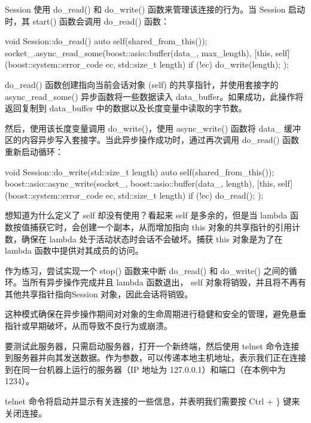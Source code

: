Session 使用 do\_read() 和 do\_write() 函数来管理该连接的行为。当 Session 启动时，其 start() 函数会调用 do\_read() 函数：

\begin{cpp}
void Session::do_read() {
    auto self(shared_from_this());
    socket_.async_read_some(boost::asio::buffer(data_,
                                            max_length),
    [this, self](boost::system::error_code ec,
                 std::size_t length) {
        if (!ec) {
            do_write(length);
        }
    });
}
\end{cpp}

do\_read() 函数创建指向当前会话对象 (self) 的共享指针，并使用套接字的 async\_read\_some() 异步函数将一些数据读入 data\_buffer。如果成功，此操作将返回复制到 data\_buffer 中的数据以及长度变量中读取的字节数。

然后，使用该长度变量调用 do\_write()，使用 async\_write() 函数将 data\_ 缓冲区的内容异步写入套接字。当此异步操作成功时，通过再次调用 do\_read() 函数重新启动循环：

\begin{cpp}
void Session::do_write(std::size_t length) {
    auto self(shared_from_this());
    boost::asio::async_write(socket_,
                             boost::asio::buffer(data_,
                                                 length),
    [this, self](boost::system::error_code ec,
                 std::size_t length) {
        if (!ec) {
            do_read();
        }
    });
}
\end{cpp}

想知道为什么定义了 self 却没有使用？看起来 self 是多余的，但是当 lambda 函数按值捕获它时，会创建一个副本，从而增加指向 this 对象的共享指针的引用计数，确保在 lambda 处于活动状态时会话不会破坏。捕获 this 对象是为了在 lambda 函数中提供对其成员的访问。

作为练习，尝试实现一个 stop() 函数来中断 do\_read() 和 do\_write() 之间的循环。当所有异步操作完成并且 lambda 函数退出， self 对象将销毁，并且将不再有其他共享指针指向Session 对象，因此会话将销毁。

这种模式确保在异步操作期间对对象的生命周期进行稳健和安全的管理，避免悬垂指针或早期破坏，从而导致不良行为或崩溃。

要测试此服务器，只需启动服务器，打开一个新终端，然后使用 telnet 命令连接到服务器并向其发送数据。作为参数，可以传递本地主机地址，表示我们正在连接到在同一台机器上运行的服务器（IP 地址为 127.0.0.1）和端口（在本例中为 1234）。

telnet 命令将启动并显示有关连接的一些信息，并表明我们需要按 Ctrl + \} 键来关闭连接。

